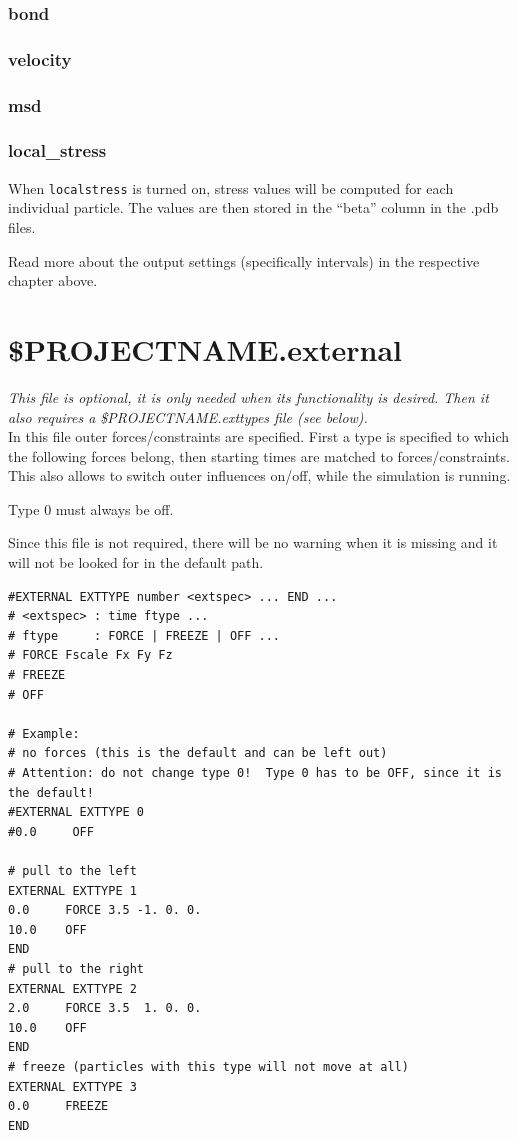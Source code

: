 \subsubsection{bond}
\subsubsection{velocity}
\subsubsection{msd} 
\subsubsection{local\_stress}                 
When \texttt{localstress} is turned on, stress values will be computed for each individual particle. The values are then stored in the ``beta'' column in the .pdb files.

\bigbreak
Read more about the output settings (specifically intervals) in the respective chapter above.



\section{\$PROJECTNAME.external}
\label{section:input:external}
\emph{This file is optional, it is only needed when its functionality is desired. Then it also requires a \$PROJECTNAME.exttypes file (see below).}\\
\bigbreak
In this file outer forces/constraints are specified. First a type is specified to which the following forces belong, then starting times are matched to forces/constraints.
This also allows to switch outer influences on/off, while the simulation is running. 

Type 0 must always be off.

Since this file is not required, there will be no warning when it is missing and it will not be looked for in the default path.
{\small
\begin{lstlisting}
#EXTERNAL EXTTYPE number <extspec> ... END ...
# <extspec> : time ftype ...
# ftype     : FORCE | FREEZE | OFF ...
# FORCE Fscale Fx Fy Fz
# FREEZE
# OFF

# Example:
# no forces (this is the default and can be left out)
# Attention: do not change type 0!  Type 0 has to be OFF, since it is the default!
#EXTERNAL EXTTYPE 0
#0.0     OFF

# pull to the left
EXTERNAL EXTTYPE 1
0.0     FORCE 3.5 -1. 0. 0.
10.0    OFF
END
# pull to the right
EXTERNAL EXTTYPE 2
2.0     FORCE 3.5  1. 0. 0.
10.0    OFF
END
# freeze (particles with this type will not move at all)
EXTERNAL EXTTYPE 3
0.0     FREEZE
END
\end{lstlisting}
}

